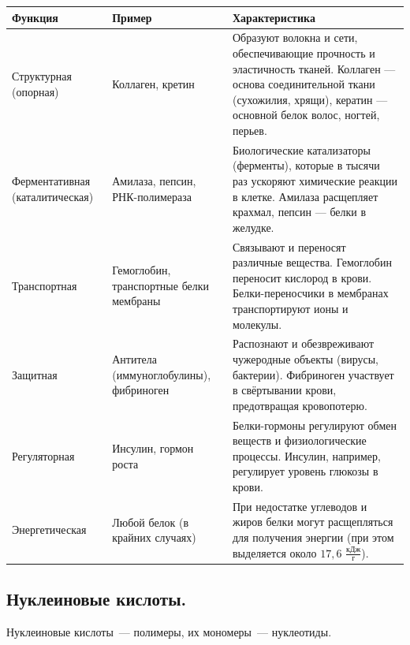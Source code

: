 \documentclass[12pt]{article}
\begin{document}
	\begin{xltabular}{\textwidth}{|X|X|X|}
		\hline
		Функция & Пример & Характеристика \\
		\hline
		Структурная (опорная) & Коллаген, кретин & Образуют волокна и сети, обеспечивающие прочность и эластичность тканей. Коллаген — основа соединительной ткани (сухожилия, хрящи), кератин — основной белок волос, ногтей, перьев. \\
		\hline
		Ферментативная (каталитическая) & Амилаза, пепсин, РНК-полимераза & Биологические катализаторы (ферменты), которые в тысячи раз ускоряют химические реакции в клетке. Амилаза расщепляет крахмал, пепсин — белки в желудке. \\
		\hline
		Транспортная & Гемоглобин, транспортные белки мембраны & Связывают и переносят различные вещества. Гемоглобин переносит кислород в крови. Белки-переносчики в мембранах транспортируют ионы и молекулы. \\
		\hline
		Защитная & Антитела (иммуноглобулины), фибриноген & Распознают и обезвреживают чужеродные объекты (вирусы, бактерии). Фибриноген участвует в свёртывании крови, предотвращая кровопотерю. \\
		\hline
		Регуляторная & Инсулин, гормон роста & Белки-гормоны регулируют обмен веществ и физиологические процессы. Инсулин, например, регулирует уровень глюкозы в крови. \\
		\hline
		Энергетическая & Любой белок (в крайних случаях) & При недостатке углеводов и жиров белки могут расщепляться для получения энергии (при этом выделяется около $17,6$ $\frac{\text{кДж}}{\text{г}}$). \\
		\hline
	\end{xltabular}
	\subsection{Нуклеиновые кислоты.}
	Нуклеиновые кислоты~--- полимеры, их мономеры~--- нуклеотиды.
\end{document}
